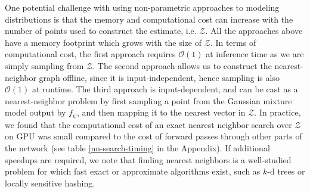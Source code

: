 \documentclass{article}
\begin{document}
One potential challenge with using non-parametric approaches to modeling distributions is that the memory and computational cost can increase with the number of points used to construct the estimate, i.e. $\mathcal{Z}$.
All the approaches above have a memory footprint which grows with the size of $\mathcal{Z}$.
In terms of computational cost, the first approach requires $\mathcal{O}(1)$ at inference time as we are simply sampling from $\mathcal{Z}$.
The second approach allows us to construct the nearest-neighbor graph offline, since it is input-independent, hence sampling is also $\mathcal{O}(1)$ at runtime.
The third approach is input-dependent, and can be cast as a nearest-neighbor problem by first sampling a point from the Gaussian mixture model output by $f_\psi$, and then mapping it to the nearest vector in $\mathcal{Z}$.
In practice, we found that the computational cost of an exact nearest neighbor search over $\mathcal{Z}$ on GPU was small compared to the cost of forward passes through other parts of the network (see table \ref{nn-search-timing} in the Appendix).
If additional speedups are required, we note that finding nearest neighbors is a well-studied problem for which fast exact or approximate algorithms exist, such as $k$-d trees or locally sensitive hashing.

\end{document}
